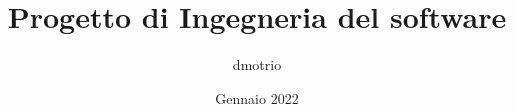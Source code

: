 \documentclass{article}
\begin{document}
    \author{dmotrio}
    \title{Progetto di Ingegneria del software}
    \date{Gennaio 2022}

    \maketitle
    \tableofcontents

    \listoffigures
    \listoftables

    
\end{document}
